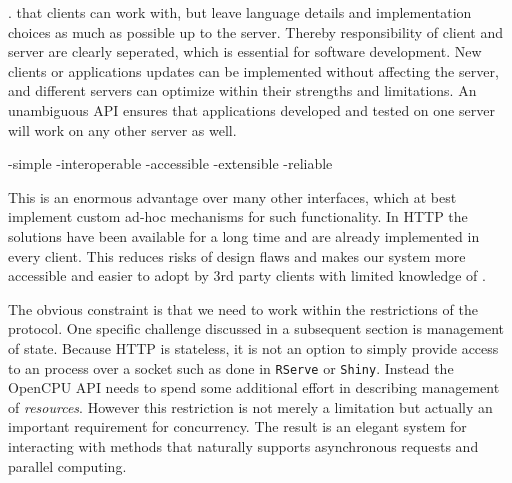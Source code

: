 .  that clients can work with, but leave language details and implementation choices as much as possible up to the server. Thereby responsibility of client and server are clearly seperated, which is essential for software development. New clients or applications updates can be implemented without affecting the server, and different servers can optimize within their strengths and limitations. An unambiguous API ensures that applications developed and tested on one server will work on any other server as well. 


-simple
-interoperable
-accessible
-extensible
-reliable

This is an enormous advantage over many other \R interfaces, which at best implement custom ad-hoc mechanisms for such functionality. In HTTP the solutions have been available for a long time and are already implemented in every client. This reduces risks of design flaws and makes our system more accessible and easier to adopt by 3rd party clients with limited knowledge of \R.

The obvious constraint is that we need to work within the restrictions of the protocol. One specific challenge discussed in a subsequent section is management of state. Because HTTP is stateless, it is not an option to simply provide access to an \R process over a socket such as done in \texttt{RServe} or \texttt{Shiny}. Instead the OpenCPU API needs to spend some additional effort in describing management of \emph{resources}. However this restriction is not merely a limitation but actually an important requirement for concurrency. The result is an elegant system for interacting with \R methods that naturally supports asynchronous requests and parallel computing. 

